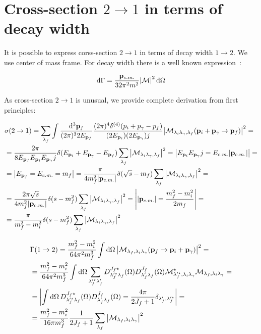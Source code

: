 \section{Cross-section $2 \rightarrow 1$ in terms of decay width}

It is possible to express corss-section $2 \rightarrow 1$ in terms of decay width $1 \rightarrow 2$. We use center of mass frame. For decay width there is a well known expression~\cite{pdg}:

\begin{align}
    \dd{\Gamma} = \frac{\mathbf{p}_{c.m.}}{32 \pi^2 m^2} \abs{\mathcal{M}}^2 \dd{\Omega}
\end{align}

As cross-section $2 \rightarrow 1$ is unusual, we provide complete derivation from first principles:

\begin{align}
        &\sigma(2 \rightarrow 1) = \sum_{\lambda_f} \int \frac{\dd[3]{\mathbf{p}_f}}{(2 \pi)^3 2 E_{\mathbf{p}_f}} \frac{(2\pi)^4 \delta^{(4)}(p_i + p_\gamma - p_f)}{(2 E_{\mathbf{p}_{i}}) (2 E_{\mathbf{p}_{\gamma}}) j} \abs{\mathcal{M}_{\lambda_i \lambda_\gamma, \lambda_f}(\mathbf{p}_i + \mathbf{p}_\gamma \rightarrow \mathbf{p}_f)}^2 = \\
        &= \frac{2\pi}{8 E_{\mathbf{p}_{f}} E_{\mathbf{p}_{i}} E_{\mathbf{p}_{\gamma}} j} \delta(E_{\mathbf{p}_{i}} + E_{\mathbf{p}_{\gamma}} - E_{\mathbf{p}_{f}}) \sum_{\lambda_f} \abs{\mathcal{M}_{\lambda_i \lambda_\gamma, \lambda_f}}^2 = \left| E_{\mathbf{p}_{i}} E_{\mathbf{p}_{\gamma}} j = E_{c.m.} \abs{\mathbf{p}_{c.m.}} \right| = \\
        &= \left| E_{\mathbf{p}_{f}} = E_{c.m.} = m_f \right| = \frac{\pi}{4 m_f^2 \abs{\mathbf{p}_{c.m.}}} \delta(\sqrt{s} - m_f) \sum_{\lambda_f} \abs{\mathcal{M}_{\lambda_i \lambda_\gamma, \lambda_f}}^2 = \\
        &= \frac{2 \pi \sqrt{s}}{4 m_f^2 \abs{\mathbf{p}_{c.m.}}} \delta(s - m_f^2) \sum_{\lambda_f} \abs{\mathcal{M}_{\lambda_i \lambda_\gamma, \lambda_f}}^2 = \left| \abs{\mathbf{p}_{c.m.}} = \frac{m_f^2 - m_i^2}{2 m_f} \right| =\\
        &= \frac{\pi}{m_f^2 - m_i^2} \delta(s - m_f^2) \sum_{\lambda_f} \abs{\mathcal{M}_{\lambda_i \lambda_\gamma, \lambda_f}}^2
\end{align}

\begin{align}
        &\Gamma(1 \rightarrow 2) =  \frac{m_f^2 - m_i^2}{64 \pi^2 m_f^3} \int \dd{\Omega} \abs{\mathcal{M}_{\lambda_f, \lambda_i \lambda_\gamma}(\mathbf{p}_f \rightarrow \mathbf{p}_i + \mathbf{p}_\gamma)}^2 = \\
        &= \frac{m_f^2 - m_i^2}{64 \pi^2 m_f^3} \int \dd{\Omega} \sum_{\lambda_f^{\prime \star} \lambda_f^{\prime}} D^{J_f \star}_{\lambda^{\prime \star}_f \lambda_f}(\Omega) D^{J_f}_{\lambda^{\prime}_f \lambda_f}(\Omega) \mathcal{M}^\star_{\lambda^{\prime \star}_f, \lambda_i \lambda_\gamma} \mathcal{M}_{\lambda_f, \lambda_i \lambda_\gamma} = \\
        &= \left| \int \dd{\Omega}D^{J_f \star}_{\lambda^{\prime \star}_f \lambda_f}(\Omega) D^{J_f}_{\lambda^{\prime}_f \lambda_f}(\Omega) = \frac{4 \pi}{2J_f + 1} \delta_{\lambda_f^\prime, \lambda_f^{\prime \star}}  \right| = \\
        &= \frac{m_f^2 - m_i^2}{16 \pi m_f^3} \frac{1}{2J_f + 1} \sum_{\lambda_f} \abs{\mathcal{M}_{\lambda_f, \lambda_i \lambda_\gamma}}^2
\end{align}

